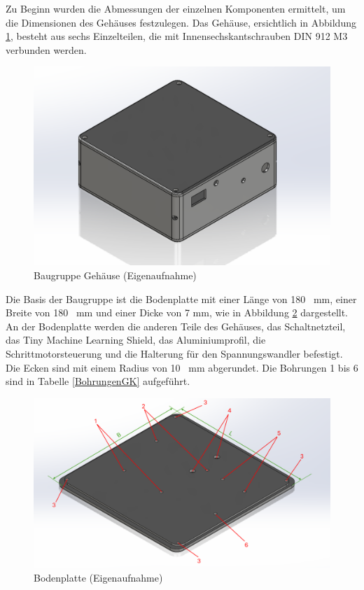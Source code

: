 Zu Beginn wurden die Abmessungen der einzelnen Komponenten ermittelt, um die Dimensionen des Gehäuses festzulegen. Das Gehäuse, ersichtlich in Abbildung \ref{GehK}, besteht aus sechs Einzelteilen, die mit Innensechskantschrauben DIN 912 M3 verbunden werden.
	\begin{figure}[H]	
	 	\begin{center}
			\includegraphics[width=\textwidth]{Images/Konstruktion/GehaeuseK.png}
			\caption{Baugruppe Gehäuse (Eigenaufnahme)} \label{GehK}
		\end{center}
	\end{figure}

Die Basis der Baugruppe ist die Bodenplatte mit einer Länge von 180 \ mm, einer Breite von 180 \ mm und einer Dicke von 7 mm, wie in Abbildung \ref{BodenK} dargestellt. An der Bodenplatte werden die anderen Teile des Gehäuses, das Schaltnetzteil, das Tiny Machine Learning Shield, das Aluminiumprofil, die Schrittmotorsteuerung und die Halterung für den Spannungswandler befestigt. Die Ecken sind mit einem Radius von 10 \ mm abgerundet. Die Bohrungen 1 bis 6 sind in Tabelle \ref{BohrungenGK} aufgeführt.

	\begin{figure}[H]
		\begin{center}
			\includegraphics[width=\textwidth]{Images/Konstruktion/BodenK.png}
			\caption{Bodenplatte (Eigenaufnahme)} \label{BodenK}
		\end{center}
	\end{figure}

